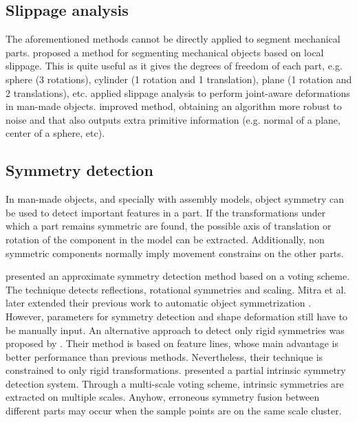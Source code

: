 \subsection{Slippage analysis}
\label{SlippageAnalysis}

The aforementioned methods cannot be directly applied to segment mechanical parts.
\cite{Gelfand2004} proposed a method for segmenting mechanical objects based on local slippage.
This is quite useful as it gives the degrees of freedom of each part, e.g. sphere (3 rotations), cylinder (1 rotation and 1 translation), plane (1 rotation and 2 translations), etc.
\cite{Xu2009} applied slippage analysis to perform joint-aware deformations in man-made objects.
\cite{Yi2014} improved \cite{Gelfand2004} method, obtaining an algorithm more robust to noise and that also outputs extra primitive information (e.g. normal of a plane, center of a sphere, etc).

\subsection{Symmetry detection}
\label{sec:symmetryDetection}

In man-made objects, and specially with assembly models, object symmetry can be used to detect important features in a part.
If the transformations under which a part remains symmetric are found, the possible axis of translation or rotation of the component in the model can be extracted.
Additionally, non symmetric components normally imply movement constrains on the other parts.

\cite{Mitra2006} presented an approximate symmetry detection method based on a voting scheme.
The technique detects reflections, rotational symmetries and scaling.
Mitra et al. later extended their previous work to automatic object symmetrization \cite{Mitra2007}.
However, parameters for symmetry detection and shape deformation still have to be manually input.
An alternative approach to detect only rigid symmetries was proposed by \cite{Bokeloh2009}.
Their method is based on feature lines, whose main advantage is better performance than previous methods.
Nevertheless, their technique is constrained to only rigid transformations.
\cite{Xu2012} presented a partial intrinsic symmetry detection system.
Through a multi-scale voting scheme, intrinsic symmetries are extracted on multiple scales.
Anyhow, erroneous symmetry fusion between different parts may occur when the sample points are on the same scale cluster. 

